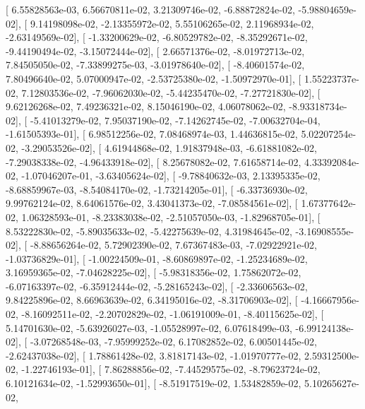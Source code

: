 \documentclass{article}
\begin{document}
       [  6.55828563e-03,   6.56670811e-02,   3.21309746e-02,
         -6.88872824e-02,  -5.98804659e-02],
       [  9.14198098e-02,  -2.13355972e-02,   5.55106265e-02,
          2.11968934e-02,  -2.63149569e-02],
       [ -1.33200629e-02,  -6.80529782e-02,  -8.35292671e-02,
         -9.44190494e-02,  -3.15072444e-02],
       [  2.66571376e-02,  -8.01972713e-02,   7.84505050e-02,
         -7.33899275e-03,  -3.01978640e-02],
       [ -8.40601574e-02,   7.80496640e-02,   5.07000947e-02,
         -2.53725380e-02,  -1.50972970e-01],
       [  1.55223737e-02,   7.12803536e-02,  -7.96062030e-02,
         -5.44235470e-02,  -7.27721830e-02],
       [  9.62126268e-02,   7.49236321e-02,   8.15046190e-02,
          4.06078062e-02,  -8.93318734e-02],
       [ -5.41013279e-02,   7.95037190e-02,  -7.14262745e-02,
         -7.00632704e-04,  -1.61505393e-01],
       [  6.98512256e-02,   7.08468974e-03,   1.44636815e-02,
          5.02207254e-02,  -3.29053526e-02],
       [  4.61944868e-02,   1.91837948e-03,  -6.61881082e-02,
         -7.29038338e-02,  -4.96433918e-02],
       [  8.25678082e-02,   7.61658714e-02,   4.33392084e-02,
         -1.07046207e-01,  -3.63405624e-02],
       [ -9.78840632e-03,   2.13395335e-02,  -8.68859967e-03,
         -8.54084170e-02,  -1.73214205e-01],
       [ -6.33736930e-02,   9.99762124e-02,   8.64061576e-02,
          3.43041373e-02,  -7.08584561e-02],
       [  1.67377642e-02,   1.06328593e-01,  -8.23383038e-02,
         -2.51057050e-03,  -1.82968705e-01],
       [  8.53222830e-02,  -5.89035633e-02,  -5.42275639e-02,
          4.31984645e-02,  -3.16908555e-02],
       [ -8.88656264e-02,   5.72902390e-02,   7.67367483e-03,
         -7.02922921e-02,  -1.03736829e-01],
       [ -1.00224509e-01,  -8.60869897e-02,  -1.25234689e-02,
          3.16959365e-02,  -7.04628225e-02],
       [ -5.98318356e-02,   1.75862072e-02,  -6.07163397e-02,
         -6.35912444e-02,  -5.28165243e-02],
       [ -2.33606563e-02,   9.84225896e-02,   8.66963639e-02,
          6.34195016e-02,  -8.31706903e-02],
       [ -4.16667956e-02,  -8.16092511e-02,  -2.20702829e-02,
         -1.06191009e-01,  -8.40115625e-02],
       [  5.14701630e-02,  -5.63926027e-03,  -1.05528997e-02,
          6.07618499e-03,  -6.99124138e-02],
       [ -3.07268548e-03,  -7.95999252e-02,   6.17082852e-02,
          6.00501445e-02,  -2.62437038e-02],
       [  1.78861428e-02,   3.81817143e-02,  -1.01970777e-02,
          2.59312500e-02,  -1.22746193e-01],
       [  7.86288856e-02,  -7.44529575e-02,  -8.79623724e-02,
          6.10121634e-02,  -1.52993650e-01],
       [ -8.51917519e-02,   1.53482859e-02,   5.10265627e-02,
\end{document}

